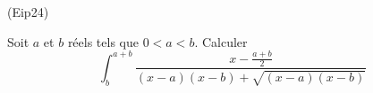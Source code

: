 \begin{tiny}(Eip24)\end{tiny} Soit $a$ et $b$ réels tels que $0<a<b$. Calculer
\begin{displaymath}
 \int_{b}^{a+b}\frac{x-\frac{a+b}{2}}{(x-a)(x-b)+\sqrt{(x-a)(x-b)}}
\end{displaymath}
 